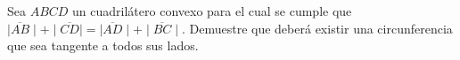 \begin{problem}
	Sea $ABCD$ un cuadrilátero convexo para el cual se cumple que  $\mid\overline{AB}\mid + \mid\overline{CD}\mid = \mid\overline{AD}\mid + \mid\overline{BC}\mid$. Demuestre que deberá existir una circunferencia que sea tangente a todos sus lados.
\end{problem}
